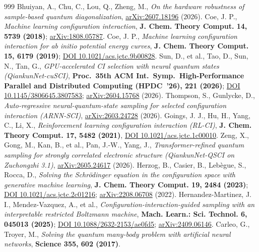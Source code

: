 \documentclass[onecolumn,a4paper]{quantumarticle}
\begin{document}
\begin{thebibliography}{999}
 Bhuiyan, A., Chu, C., Lou, Q., Zheng, M., \emph{On the hardware robustness of sample-based quantum diagonalization}, \href{https://arxiv.org/abs/2607.18196}{arXiv:2607.18196} (2026).
 Coe, J. P., \emph{Machine learning configuration interaction}, \textbf{J. Chem. Theory Comput. 14, 5739 (2018)}; \href{https://arxiv.org/abs/1808.05787}{arXiv:1808.05787}.
 Coe, J. P., \emph{Machine learning configuration interaction for ab initio potential energy curves}, \textbf{J. Chem. Theory Comput. 15, 6179 (2019)}; \href{https://doi.org/10.1021/acs.jctc.9b00828}{DOI 10.1021/acs.jctc.9b00828}.
 Sun, D., et al., Tao, D., Sun, N., Tan, G., \emph{GPU-accelerated CI selection with neural quantum states (QiankunNet-cuSCI)}, \textbf{Proc.\ 35th ACM Int.\ Symp.\ High-Performance Parallel and Distributed Computing (HPDC~'26), 221 (2026)}; \href{https://doi.org/10.1145/3806645.3807583}{DOI 10.1145/3806645.3807583}; \href{https://arxiv.org/abs/2604.15768}{arXiv:2604.15768} (2026).
 Thompson, S., Gunlycke, D., \emph{Auto-regressive neural-quantum-state sampling for selected configuration interaction (ARNN-SCI)}, \href{https://arxiv.org/abs/2603.24728}{arXiv:2603.24728} (2026).
 Goings, J. J., Hu, H., Yang, C., Li, X., \emph{Reinforcement learning configuration interaction (RL-CI)}, \textbf{J. Chem. Theory Comput. 17, 5482 (2021)}, \href{https://doi.org/10.1021/acs.jctc.1c00010}{DOI 10.1021/acs.jctc.1c00010}.
 Zeng, X., Gong, M., Kan, B., et al., Pan, J.-W., Yang, J., \emph{Transformer-refined quantum sampling for strongly correlated electronic structure (QiankunNet-QSCI on Zuchongzhi 3.1)}, \href{https://arxiv.org/abs/2605.24617}{arXiv:2605.24617} (2026).
 Herzog, B., Casier, B., Lebègue, S., Rocca, D., \emph{Solving the Schrödinger equation in the configuration space with generative machine learning}, \textbf{J. Chem. Theory Comput. 19, 2484 (2023)}; \href{https://doi.org/10.1021/acs.jctc.2c01216}{DOI 10.1021/acs.jctc.2c01216}; \href{https://arxiv.org/abs/2208.06708}{arXiv:2208.06708} (2022).
 Hernandez-Martinez, J. I., Mendez-Vazquez, A., et al., \emph{Configuration-interaction-guided sampling with an interpretable restricted Boltzmann machine}, \textbf{Mach. Learn.: Sci. Technol. 6, 045013 (2025)}; \href{https://doi.org/10.1088/2632-2153/ae0fd5}{DOI 10.1088/2632-2153/ae0fd5}; \href{https://arxiv.org/abs/2409.06146}{arXiv:2409.06146}.
 Carleo, G., Troyer, M., \emph{Solving the quantum many-body problem with artificial neural networks}, \textbf{Science 355, 602 (2017)}.

\end{thebibliography}
\end{document}
